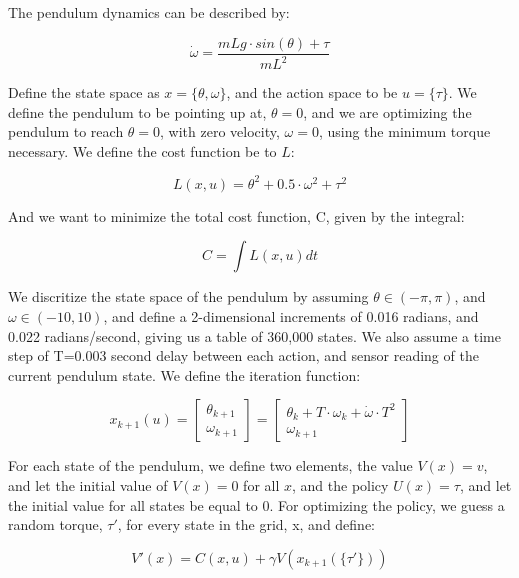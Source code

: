 \documentclass{article}
\begin{document}
The pendulum dynamics can be described by:

\begin{equation} 
\dot{\omega} = \frac{mLg \cdot sin(\theta) + \tau}{mL^2}
\end{equation}

Define the state space as $x=\{\theta, \omega\}$, and the action space to be $u=\{\tau\}$. We define the pendulum to be pointing up at, $\theta = 0$, and we are optimizing the pendulum to reach $\theta = 0$, with zero velocity, $\omega = 0$, using the minimum torque necessary. We define the cost function be to $L$:

\begin{equation} 
L(x,u) = \theta^2 + 0.5 \cdot \omega^2 + \tau^2
\end{equation}

And we want to minimize the total cost function, C, given by the integral: 

\begin{equation} 
C = \int L(x,u) dt
\end{equation}

We discritize the state space of the pendulum by assuming $\theta \in  (-\pi,\pi)$, and $\omega \in (-10,10)$, and define a 2-dimensional increments of 0.016 radians, and 0.022 radians/second, giving us a table of 360,000 states. We also assume a time step of T=0.003 second delay between each action, and sensor reading of the current pendulum state. We define the iteration function:

\begin{equation} 
x_{k+1}(u) = 
\begin{bmatrix}
\theta_{k+1} \\
\omega_{k+1}
\end{bmatrix}
=
\begin{bmatrix}
\theta_{k} + T \cdot \omega_{k} + \dot{\omega} \cdot T^2 \\
\omega_{k+1}
\end{bmatrix}
\end{equation}

For each state of the pendulum, we define two elements, the value $V(x) = {v}$, and let the initial value of $V(x)=0$ for all $x$, and the policy $U(x)={\tau}$, and let the initial value for all states be equal to 0. For optimizing the policy, we guess a random torque, $\tau'$, for every state in the grid, x, and define:

\begin{equation} 
V'(x) = C(x,u) + \gamma V(x_{k+1}(\{\tau '\}))
\end{equation}
\end{document}
